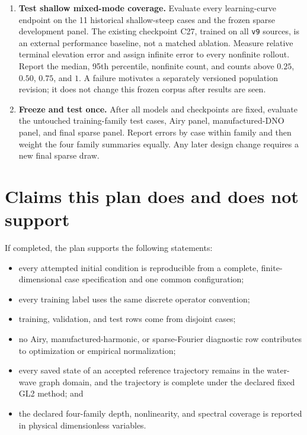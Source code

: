 \documentclass[11pt]{article}
\begin{document}
\begin{enumerate}
  \item \textbf{Test shallow mixed-mode coverage.}
        Evaluate every learning-curve endpoint on the 11 historical
        shallow-steep cases and the frozen sparse development panel.  The
        existing checkpoint C27, trained on all \texttt{v9} sources, is an
        external performance baseline, not a matched ablation.  Measure
        relative terminal elevation error and assign infinite error to every
        nonfinite rollout.  Report the median, 95th percentile, nonfinite
        count, and counts above $0.25$, $0.50$, $0.75$, and $1$.  A failure
        motivates a separately versioned population revision; it does not
        change this frozen corpus after results are seen.

  \item \textbf{Freeze and test once.}
        After all models and checkpoints are fixed, evaluate the untouched
        training-family test cases, Airy panel, manufactured-DNO panel, and
        final sparse panel.  Report errors by case within family and then
        weight the four family summaries equally.  Any later design change
        requires a new final sparse draw.
\end{enumerate}

\section{Claims this plan does and does not support}

If completed, the plan supports the following statements:
\begin{itemize}
  \item every attempted initial condition is reproducible from a complete,
        finite-dimensional case specification and one common configuration;
  \item every training label uses the same discrete operator convention;
  \item training, validation, and test rows come from disjoint cases;
  \item no Airy, manufactured-harmonic, or sparse-Fourier diagnostic row
        contributes to optimization or empirical normalization;
  \item every saved state of an accepted reference trajectory remains in the
        water-wave graph domain, and the trajectory is complete under the
        declared fixed GL2 method; and
  \item the declared four-family depth, nonlinearity, and spectral coverage is
        reported in physical dimensionless variables.
\end{itemize}
\end{document}
